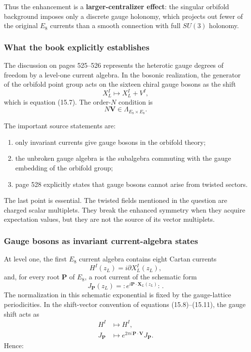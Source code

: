 \documentclass[
  10pt,
  a4paper,
  openany]{book}
\providecommand{\tightlist}{%
  \setlength{\itemsep}{0pt}\setlength{\parskip}{0pt}}
\begin{document}
Thus the enhancement is a \textbf{larger-centralizer effect}: the
singular orbifold background imposes only a discrete gauge holonomy,
which projects out fewer of the original \(E_8\) currents than a smooth
connection with full \(SU(3)\) holonomy.

\subsubsection{What the book explicitly
establishes}\label{what-the-book-explicitly-establishes}

The discussion on pages 525--526 represents the heterotic gauge degrees
of freedom by a level-one current algebra. In the bosonic realization,
the generator of the orbifold point group acts on the sixteen chiral
gauge bosons as the shift \[
X_L^I
\longmapsto
X_L^I+V^I,
\] which is equation (15.7). The order-\(N\) condition is \[
N\mathbf V\in\Lambda_{E_8\times E_8}.
\]

The important source statements are:

\begin{enumerate}
\def\labelenumi{\arabic{enumi}.}
\tightlist
\item
  only invariant currents give gauge bosons in the orbifold theory;
\item
  the unbroken gauge algebra is the subalgebra commuting with the gauge
  embedding of the orbifold group;
\item
  page 528 explicitly states that gauge bosons cannot arise from twisted
  sectors.
\end{enumerate}

The last point is essential. The twisted fields mentioned in the
question are charged scalar multiplets. They break the enhanced symmetry
when they acquire expectation values, but they are not the source of its
vector multiplets.

\subsubsection{Gauge bosons as invariant current-algebra
states}\label{gauge-bosons-as-invariant-current-algebra-states}

At level one, the first \(E_8\) current algebra contains eight Cartan
currents \[
H^I(z_L)=i\partial X_L^I(z_L),
\] and, for every root \(\mathbf P\) of \(E_8\), a root current of the
schematic form \[
J_{\mathbf P}(z_L)
=
:\!e^{i\mathbf P\cdot\mathbf X_L(z_L)}\!:\, .
\] The normalization in this schematic exponential is fixed by the
gauge-lattice periodicities. In the shift-vector convention of equations
(15.8)--(15.11), the gauge shift acts as \[
\begin{aligned}
H^I
&\longmapsto H^I,\\
J_{\mathbf P}
&\longmapsto
e^{2\pi i\,\mathbf P\cdot\mathbf V}J_{\mathbf P}.
\end{aligned}
\] Hence:
\end{document}
